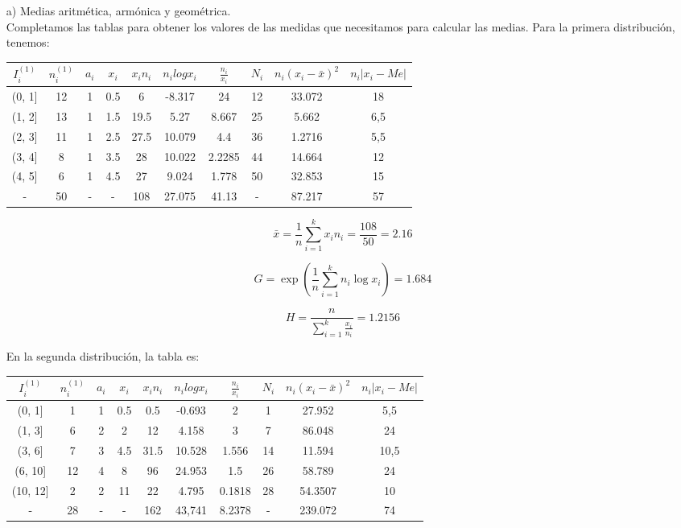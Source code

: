 \documentclass[a4paper,12pt]{article}
\begin{document}
\begin{itemize}
    \item[a)] Medias aritmética, armónica y geométrica.\\
Completamos las tablas para obtener los valores de las medidas que necesitamos para calcular las medias. Para la primera distribución, tenemos:
\begin{center}
    \begin{tabular}{|c|c|c|c|c|c|c|c|c|c|}
        \hline
        $I_i^{(1)}$ & $n_i^{(1)}$ & $a_i$ & $x_i$ & $x_in_i$ & $n_ilogx_i$ & $\frac{n_i}{x_i}$ & $N_i$ & $n_i(x_i-\bar x)^2$ & $n_i|x_i-Me|$\\
        \hline
        (0, 1] & 12 & 1 & 0.5 & 6 & -8.317 & 24 & 12 & 33.072 & 18 \\
        (1, 2] & 13 & 1 & 1.5 & 19.5 & 5.27 & 8.667 & 25 & 5.662 & 6,5 \\
        (2, 3] & 11 & 1 & 2.5 & 27.5 & 10.079 & 4.4 & 36 & 1.2716 & 5,5 \\
        (3, 4] & 8 & 1 & 3.5 & 28 & 10.022 & 2.2285 & 44 & 14.664 & 12\\
        (4, 5] & 6 & 1 & 4.5 & 27 & 9.024 & 1.778 & 50 & 32.853 & 15\\
        \hline
        - & 50 & - & - & 108  & 27.075 & 41.13 & - & 87.217 & 57\\
        \hline
    \end{tabular}
\end{center}

    $$\bar x = \frac {1}{n} \sum\limits_{i = 1}^k {x_i n_i} = \frac{108}{50} = 2.16 $$

    $$G = \exp\left(\frac{1}{n} \sum\limits_{i = 1}^k n_i \log x_i\right) = 1.684$$

    $$H = \frac{n}{\sum\limits_{i = 1}^k \frac{x_i}{n_i}} = 1.2156$$

    En la segunda distribución, la tabla es:
\begin{center}
    \begin{tabular}{|c|c|c|c|c|c|c|c|c|c|}
        \hline
        $I_i^{(1)}$ & $n_i^{(1)}$ & $a_i$ & $x_i$ & $x_in_i$ & $n_ilogx_i$ & $\frac{n_i}{x_i}$ & $N_i$ & $n_i(x_i-\bar x)^2$ & $n_i|x_i-Me|$ \\
        \hline
        (0, 1] & 1 & 1 & 0.5 & 0.5 & -0.693 & 2 & 1 & 27.952 & 5,5\\
        (1, 3] & 6 & 2 & 2 & 12 & 4.158 & 3 & 7 & 86.048 & 24\\
        (3, 6] & 7 & 3 & 4.5 & 31.5 & 10.528 & 1.556 & 14 & 11.594 & 10,5\\
        (6, 10] & 12 & 4 & 8 & 96 & 24.953 & 1.5 & 26 & 58.789 & 24\\
        (10, 12] & 2 & 2 & 11 & 22 & 4.795 & 0.1818 & 28 & 54.3507 & 10\\
        \hline
        - & 28 & - & - & 162 & 43,741 & 8.2378 & - & 239.072 & 74\\
        \hline
    \end{tabular}
\end{center}


\end{itemize}
\end{document}
